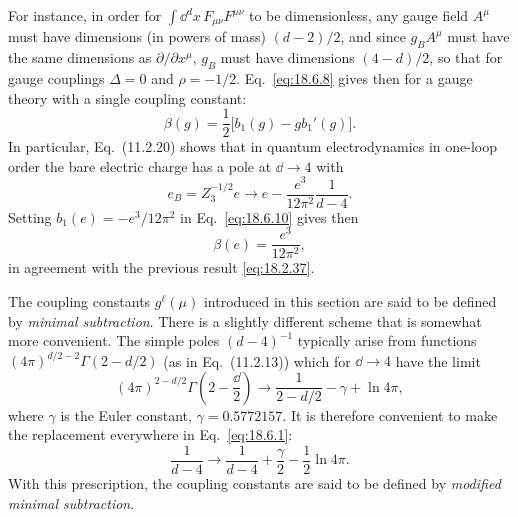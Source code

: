 For instance, in order for $\int \dd^d x\,F_{\mu\nu}F^{\mu\nu}$ to be dimensionless, any gauge field $A^\mu$ must have dimensions (in powers of mass) $(d-2)/2$, and since $g_BA^\mu$ must have the same dimensions as $\partial/\partial x^\mu$, $g_B$ must have dimensions $(4-d)/2$, so that for gauge couplings $\Delta=0$ and $\rho=-1/2$. Eq.~\eqref{eq:18.6.8} gives then for a gauge theory with a single coupling constant:
\begin{equation}
\beta(g)=\frac{1}{2}\bigl[b_1(g)-g b_1'(g)\bigr].
\tag{18.6.10}\label{eq:18.6.10}
\end{equation}
In particular, Eq.~(11.2.20) shows that in quantum electrodynamics in one-loop order the bare electric charge has a pole at $\dd\to4$ with
\begin{equation}
e_B=Z_3^{-1/2}e\to e-\frac{e^3}{12\pi^2}\frac{1}{d-4}.
\tag{18.6.11}\label{eq:18.6.11}
\end{equation}
Setting $b_1(e)=-e^3/12\pi^2$ in Eq.~\eqref{eq:18.6.10} gives then
\begin{equation}
\beta(e)=\frac{e^3}{12\pi^2},
\tag{18.6.12}\label{eq:18.6.12}
\end{equation}
in agreement with the previous result \eqref{eq:18.2.37}.

The coupling constants $g^\ell(\mu)$ introduced in this section are said to be defined by \emph{minimal subtraction}. There is a slightly different scheme that is somewhat more convenient. The simple poles $(d-4)^{-1}$ typically arise from functions $(4\pi)^{d/2-2}\Gamma(2-d/2)$ (as in Eq.~(11.2.13)) which for $\dd\to4$ have the limit
\begin{equation}
(4\pi)^{2-d/2}\Gamma\left(2-\frac{\dd}{2}\right)
\to\frac{1}{2-d/2}-\gamma+\ln4\pi,
\tag{18.6.13}\label{eq:18.6.13}
\end{equation}
where $\gamma$ is the Euler constant, $\gamma=0.5772157$. It is therefore convenient to make the replacement everywhere in Eq.~\eqref{eq:18.6.1}:
\begin{equation}
\frac{1}{d-4}\to\frac{1}{d-4}+\frac{\gamma}{2}-\frac{1}{2}\ln4\pi.
\tag{18.6.14}\label{eq:18.6.14}
\end{equation}
With this prescription, the coupling constants are said to be defined by \emph{modified minimal subtraction}.

